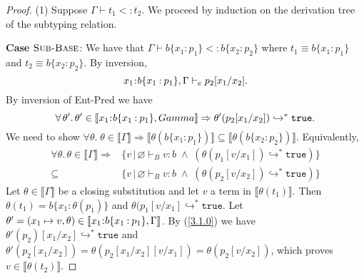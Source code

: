 \documentclass[11pt]{article}
\newcommand{\bind}{\hspace{0.05em}{:}\hspace{0.05em}} %
\newcommand{\col}{\mathbin{:}}       %
\newcommand{\lb}{\llbracket}         %
\newcommand{\rb}{\rrbracket}         %
\newcommand{\many}{\hookrightarrow^*}
\newcommand{\true}{\mathtt{true}}
\begin{document}
\begin{proof} 
(1) Suppose $\Gamma \vdash t_1 <: t_2$. We proceed by induction on the derivation tree of the subtyping relation.


{\bf Case} $\textsc{Sub-Base}$: We have that 
$\Gamma \vdash b\{x_1\col p_1\} <: b\{x_2\col p_2\}$ where $t_1 \equiv b\{x_1\col p_1\}$ and $t_2 \equiv b\{x_2\col p_2\}$.
By inversion, 
\[ x_1\bind b\{x_1\col p_1\}, \Gamma \vdash_e  p_2[x_1/x_2].\] 
By inversion of {\sc Ent-Pred} we have 
\begin{equation}\label{3.1.0}
\forall\,\theta'.\,\theta'\in\lb x_1\bind b\{x_1\col p_1\}, Gamma \rb \Rightarrow \theta'(p_2[x_1/x_2]) \many \true.
\end{equation}
We need to show $\forall \theta.\; 
\theta \in \lb \Gamma \rb \Rightarrow 
\lb\theta(b\{x_1:p_1\})\rb \subseteq \lb\theta(b\{x_2:p_2\})\rb.$
Equivalently,
\begin{align}\label{3.1.1}
\forall\theta.\,\theta\in\lb\Gamma\rb \Rightarrow&
\{ v \,|\, \varnothing \vdash_B v:b \;\wedge\; 
  (\theta(p_1[v/x_1]) \many \true)\}\\
\subseteq &\{ v \,|\, \varnothing \vdash_B v:b \;\wedge\; 
  (\theta(p_2[v/x_2]) \many \true)\}\label{3.1.2}
\end{align}
Let $\theta \in \lb\Gamma\rb$ be a closing substitution and
let $v$ a term in $\lb\theta(t_1)\rb$. 
Then $\theta(t_1) = b\{x_1\col \theta(p_1)\}$ and $\theta(p_1[v/x_1] \many \true$.
Let $\theta' = (x_1 \mapsto v, \theta) \in \lb x_1\bind b\{ x_1\col p_1\}, \Gamma\rb$.
By (\ref{3.1.0}) we have
$ \theta'(p_2)[x_1/x_2] \many \true$ and $\theta'(p_2[x_1/x_2]) = \theta(p_2[x_1/x_2][v/x_1]) = \theta(p_2[v/x_2])$,
which proves $v \in \lb\theta(t_2)\rb$.


\end{proof}
\end{document}
